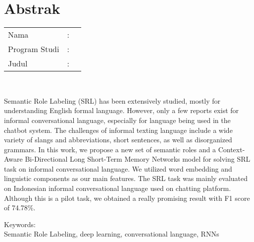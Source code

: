 %
%
%

\chapter*{Abstrak}

\vspace*{0.2cm}

\noindent \begin{tabular}{l l p{10cm}}
	Nama&: & \penulis \\
	Program Studi&: & \program \\
	Judul&: & \judul \\
\end{tabular} \\ 

\vspace*{0.5cm}

\noindent 

Semantic Role Labeling (SRL) has been extensively studied, mostly for understanding English formal language. However, only a few reports exist for informal conversational language, especially for language being used in the chatbot system. The challenges of informal texting language include a wide variety of slangs and abbreviations, short sentences, as well as disorganized grammars. In this work, we propose a new set of semantic roles and a Context-Aware Bi-Directional Long Short-Term Memory Networks model for solving SRL task on informal conversational language. We utilized word embedding and linguistic components as our main features. The SRL task was mainly evaluated on Indonesian informal conversational language used on chatting platform. Although this is a pilot task, we obtained a really promising result with F1 score of 74.78\%.


\vspace*{0.2cm}

\noindent Keywords: \\ 
\noindent Semantic Role Labeling, deep learning, conversational language, RNNs \\ 

\newpage